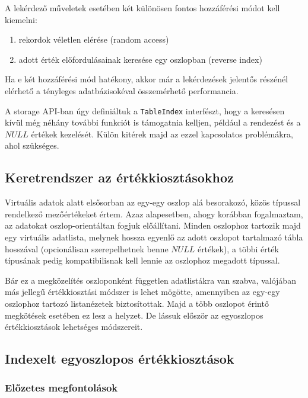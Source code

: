 \documentclass[
    parspace,
    noindent,
    nohyp,
]{elteiktdk}[2023/04/10]
\begin{document}
A lekérdező műveletek esetében két különösen fontos hozzáférési módot kell kiemelni:

\begin{enumerate}
  \item rekordok véletlen elérése (random access)
  \item adott érték előfordulásainak keresése egy oszlopban (reverse index)
\end{enumerate}

Ha e két hozzáférési mód hatékony, akkor már a lekérdezések jelentős részénél
elérhető a tényleges adatbázisokéval összemérhető performancia.

A storage API-ban úgy definiáltuk a \texttt{TableIndex} interfészt,
hogy a keresésen kívül még néhány további funkciót is támogatnia kelljen,
például a rendezést és a $NULL$ értékek kezelését.
Külön kitérek majd az ezzel kapcsolatos problémákra, ahol szükséges.

\subsection{Keretrendszer az értékkiosztásokhoz}

Virtuális adatok alatt elsősorban az egy-egy oszlop alá besorakozó,
közös típussal rendelkező mezőértékeket értem.
Azaz alapesetben, ahogy korábban fogalmaztam, az adatokat oszlop-orientáltan fogjuk előállítani.
Minden oszlophoz tartozik majd egy virtuális adatlista,
melynek hossza egyenlő az adott oszlopot tartalmazó tábla hosszával
(opcionálisan szerepelhetnek benne $NULL$ értékek),
a többi érték típusának pedig kompatibilisnak kell lennie az oszlophoz megadott típussal.

Bár ez a megközelítés oszloponként független adatlistákra van szabva,
valójában más jellegű értékkiosztási módszer is lehet mögötte,
amennyiben az egy-egy oszlophoz tartozó listanézetek biztosítottak.
Majd a több oszlopot érintő megkötések esetében ez lesz a helyzet.
De lássuk először az egyoszlopos értékkiosztások lehetséges módszereit.

\subsection{Indexelt egyoszlopos értékkiosztások}

\subsubsection{Előzetes megfontolások}
\end{document}
